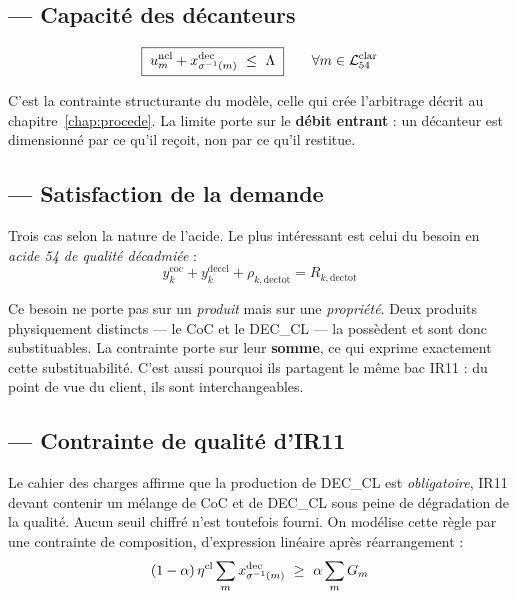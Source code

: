\subsection{ --- Capacité des décanteurs}

\begin{equation}
\boxed{\;u^{\mathrm{ncl}}_m + x^{\mathrm{dec}}_{\sigma^{-1}(m)} \ \le\ \Lambda\;}
\qquad \forall m \in \mathcal{L}^{\mathrm{clar}}_{54}
\label{eq:C11}
\end{equation}

C'est la contrainte structurante du modèle, celle qui crée l'arbitrage décrit au
chapitre~\ref{chap:procede}. La limite porte sur le \textbf{débit entrant} : un décanteur
est dimensionné par ce qu'il reçoit, non par ce qu'il restitue.

\subsection{ --- Satisfaction de la demande}

Trois cas selon la nature de l'acide. Le plus intéressant est celui du besoin en
\emph{acide 54 de qualité décadmiée} :
\begin{equation}
\boxed{\;y^{\mathrm{coc}}_{k} + y^{\mathrm{deccl}}_{k} + \rho_{k,\mathrm{dectot}} = R_{k,\mathrm{dectot}}\;}
\label{eq:C14-dectot}
\end{equation}

\begin{encadre}
Ce besoin ne porte pas sur un \emph{produit} mais sur une \emph{propriété}. Deux produits
physiquement distincts --- le CoC et le DEC\_CL --- la possèdent et sont donc
substituables. La contrainte porte sur leur \textbf{somme}, ce qui exprime exactement cette
substituabilité. C'est aussi pourquoi ils partagent le même bac IR11 : du point de vue du
client, ils sont interchangeables.
\end{encadre}

\subsection{ --- Contrainte de qualité d'IR11}

Le cahier des charges affirme que la production de DEC\_CL est \emph{obligatoire}, IR11
devant contenir un mélange de CoC et de DEC\_CL sous peine de dégradation de la qualité.
Aucun seuil chiffré n'est toutefois fourni. On modélise cette règle par une contrainte de
composition, d'expression linéaire après réarrangement :
\begin{equation}
(1-\alpha)\,\eta^{\mathrm{cl}} \sum_{m} x^{\mathrm{dec}}_{\sigma^{-1}(m)} \ \ge\ \alpha \sum_{m} G_m
\label{eq:C15}
\end{equation}

